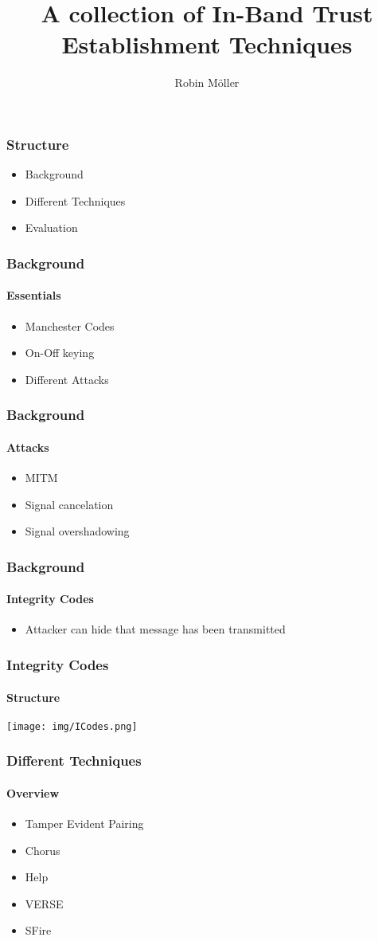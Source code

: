 \documentclass{beamer}
\title{A collection of In-Band Trust Establishment Techniques}
\author{Robin Möller}
\institute[]{Technical University Munich}
\begin{document}
\begin{frame}
\titlepage
\end{frame}

\begin{frame}
\frametitle{Structure}
\begin{itemize}
	\item Background
	\item Different Techniques
	\item Evaluation
\end{itemize}
\end{frame}

\begin{frame}
	\frametitle{Background}
	\framesubtitle{Essentials}
	\begin{itemize}
		\item Manchester Codes
		\item On-Off keying
		\item Different Attacks
	\end{itemize}
\end{frame}

\begin{frame}
	\frametitle{Background}
	\framesubtitle{Attacks}
	\begin{itemize}
		\item MITM
		\item Signal cancelation
		\item Signal overshadowing
	\end{itemize}
\end{frame}

\begin{frame}
	\frametitle{Background}
	\framesubtitle{Integrity Codes}
	\begin{itemize}
		\item Attacker can hide that message has been transmitted
	\end{itemize}
\end{frame}

\begin{frame}
	\frametitle{Integrity Codes}
	\framesubtitle{Structure}
	\texttt{[image: img/ICodes.png]}
\end{frame}

\begin{frame}
	\frametitle{Different Techniques}
	\framesubtitle{Overview}
	\begin{itemize}
		\item Tamper Evident Pairing
		\item Chorus
		\item Help
		\item VERSE
		\item SFire
	\end{itemize}
\end{frame}
\end{document}
